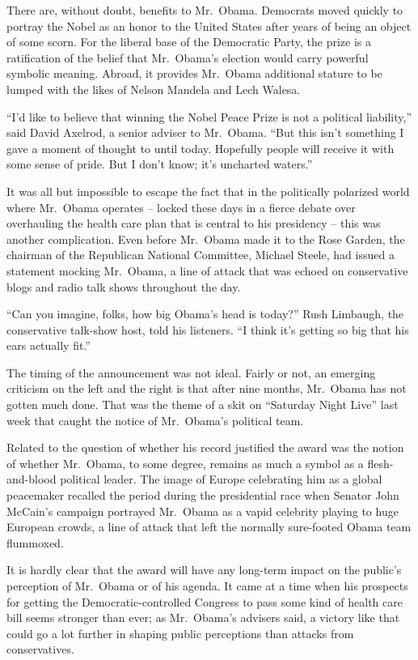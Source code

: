 ﻿\documentclass[12pt]{article}
\begin{document}
There are, without doubt, benefits to Mr.~Obama. Democrats moved quickly to portray the Nobel as an
honor to the United States after years of being an object of some scorn. For the liberal base of the
Democratic Party, the prize is a ratification\cite{ratification} of the belief that Mr.~Obama's
election would carry powerful symbolic meaning. Abroad, it provides Mr.~Obama additional stature to
be lumped with the likes of Nelson Mandela and Lech Walesa.

``I'd like to believe that winning the Nobel Peace Prize is not a political liability,'' said David
Axelrod, a senior adviser to Mr.~Obama. ``But this isn't something I gave a moment of thought to
until today. Hopefully people will receive it with some sense of pride. But I don't know; it's
uncharted waters.''

It was all but impossible to escape the fact that in the politically polarized world where Mr.~Obama
operates -- locked these days in a fierce debate over overhauling the health care plan that is
central to his presidency -- this was another complication. Even before Mr.~Obama made it to the
Rose Garden, the chairman of the Republican National Committee, Michael Steele, had issued a
statement mocking Mr.~Obama, a line of attack that was echoed on conservative blogs and radio talk
shows throughout the day.

``Can you imagine, folks, how big Obama's head is today?'' Rush Limbaugh, the conservative talk-show
host, told his listeners. ``I think it's getting so big that his ears actually fit.''

The timing of the announcement was not ideal. Fairly or not, an emerging criticism on the left and
the right is that after nine months, Mr.~Obama has not gotten much done. That was the theme of a
skit on ``Saturday Night Live'' last week that caught the notice of Mr.~Obama's political team.

Related to the question of whether his record justified the award was the notion of whether
Mr.~Obama, to some degree, remains as much a symbol as a flesh-and-blood political leader. The image
of Europe celebrating him as a global peacemaker recalled the period during the presidential race
when Senator John McCain's campaign portrayed Mr.~Obama as a vapid celebrity playing to huge
European crowds, a line of attack that left the normally sure-footed Obama team
flummoxed\cite{flummox}.

It is hardly clear that the award will have any long-term impact on the public's
perception\cite{perception} of Mr.~Obama or of his agenda. It came at a time when his prospects for
getting the Democratic-controlled Congress to pass some kind of health care bill seems stronger than
ever; as Mr.~Obama's advisers said, a victory like that could go a lot further in shaping public
perceptions than attacks from conservatives.
\end{document}
